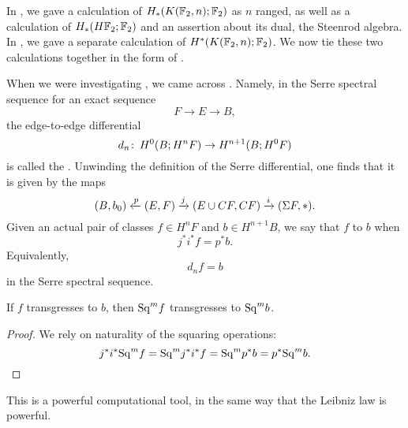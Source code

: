 
In , we gave a calculation of $H_*(K(\mathbb F_2, n); \mathbb F_2)$ as $n$ ranged, as well as a calculation of $H_*(H\mathbb F_2; \mathbb F_2)$ and an assertion about its dual, the Steenrod algebra.
In , we gave a separate calculation of $H^*(K(\mathbb F_2, n); \mathbb F_2)$.
We now tie these two calculations together in the form of .

\begin{definition}
When we were investigating , we came across .
Namely, in the Serre spectral sequence for an exact sequence \[F \to E \to B,\] the edge-to-edge differential \[d_n\colon\thinspace H^0(B; H^n F) \to H^{n+1}(B; H^0 F)\] is called the .
Unwinding the definition of the Serre differential, one finds that it is given by the maps \[(B, b_0) \xleftarrow p (E, F) \xrightarrow j (E \cup CF, CF) \xrightarrow i (\Sigma F, *).\]
Given an actual pair of classes $f \in H^n F$ and $b \in H^{n+1} B$, we say that $f$  to $b$ when \[j^* i^* f = p^* b.\]
Equivalently, \[d_n f = b\] in the Serre spectral sequence.
\end{definition}

\begin{lemma}\label{KudosThm}
If $f$ transgresses to $b$, then $\mathrm{Sq}^m f$ transgresses to $\mathrm{Sq}^m b$.
\end{lemma}
\begin{proof}
We rely on naturality of the squaring operations: \[j^* i^* \mathrm{Sq}^m f = \mathrm{Sq}^m j^* i^* f = \mathrm{Sq}^m p^* b = p^* \mathrm{Sq}^m b. \qedhere\]
\end{proof}

This is a powerful computational tool, in the same way that the Leibniz law is powerful.

